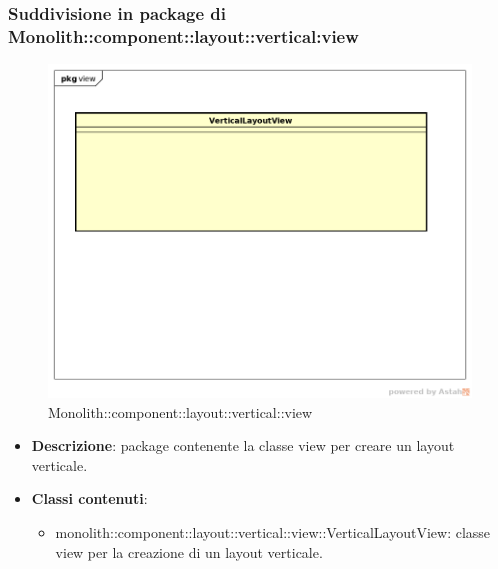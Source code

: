 \subsubsection{Suddivisione in package  di Monolith::component::layout::vertical:view}
\label{Monolith::component::layout::vertical::view}
\begin{figure}[H]
	\centering
	\includegraphics[scale=0.5]{Sezioni/imgPackage/component_layout_vertical_view.png}
	\caption{Monolith::component::layout::vertical::view}
\end{figure}
\begin{itemize}
	\item{\textbf{Descrizione}}: package contenente la classe view per creare un layout verticale.
	\item{\textbf{Classi contenuti}}:
	\begin{itemize}
	\item{monolith::component::layout::vertical::view::VerticalLayoutView}: classe view per la creazione di un layout verticale.
	\end{itemize}
\end{itemize}

